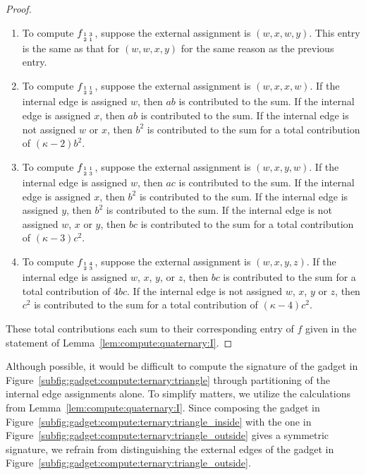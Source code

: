 \documentclass[11pt]{article}
\newcommand{\subMat}[4]{\mbox{\scriptsize $\begin{smallmatrix} #1 & #4 \\ #2 & #3 \end{smallmatrix}$}}
\begin{document}
\begin{proof}
\begin{enumerate}
  \item To compute $f_{\subMat{1}{2}{1}{3}}$,
  suppose the external assignment is $(w,x,w,y)$.
  This entry is the same as that for $(w,w,x,y)$ for the same reason as the previous entry.
  
  \item To compute $f_{\subMat{1}{2}{2}{1}}$,
  suppose the external assignment is $(w,x,x,w)$.
  If the internal edge is assigned $w$,
  then $a b$ is contributed to the sum.
  If the internal edge is assigned $x$,
  then $a b$ is contributed to the sum.
  If the internal edge is not assigned $w$ or $x$,
  then $b^2$ is contributed to the sum for a total contribution of $(\kappa - 2) b^2$.
  
  \item To compute $f_{\subMat{1}{2}{3}{1}}$,
  suppose the external assignment is $(w,x,y,w)$.
  If the internal edge is assigned $w$,
  then $a c$ is contributed to the sum.
  If the internal edge is assigned $x$,
  then $b^2$ is contributed to the sum.
  If the internal edge is assigned $y$,
  then $b^2$ is contributed to the sum.
  If the internal edge is not assigned $w$, $x$ or $y$,
  then $b c$ is contributed to the sum for a total contribution of $(\kappa - 3) c^2$.
  
  \item To compute $f_{\subMat{1}{2}{3}{4}}$,
  suppose the external assignment is $(w,x,y,z)$.
  If the internal edge is assigned $w$, $x$, $y$, or $z$,
  then $b c$ is contributed to the sum for a total contribution of $4 b c$.
  If the internal edge is not assigned $w$, $x$, $y$ or $z$,
  then $c^2$ is contributed to the sum for a total contribution of $(\kappa - 4) c^2$.
 \end{enumerate}
 These total contributions each sum to their corresponding entry of $f$ given in the statement of Lemma~\ref{lem:compute:quaternary:I}.
\end{proof}

Although possible,
it would be difficult to compute the signature of the gadget in Figure~\ref{subfig:gadget:compute:ternary:triangle}
through partitioning of the internal edge assignments alone.
To simplify matters,
we utilize the calculations from Lemma~\ref{lem:compute:quaternary:I}.
Since composing the gadget in Figure~\ref{subfig:gadget:compute:ternary:triangle_inside}
with the one in Figure~\ref{subfig:gadget:compute:ternary:triangle_outside} gives a symmetric signature,
we refrain from distinguishing the external edges of the gadget in Figure~\ref{subfig:gadget:compute:ternary:triangle_outside}.
\end{document}
